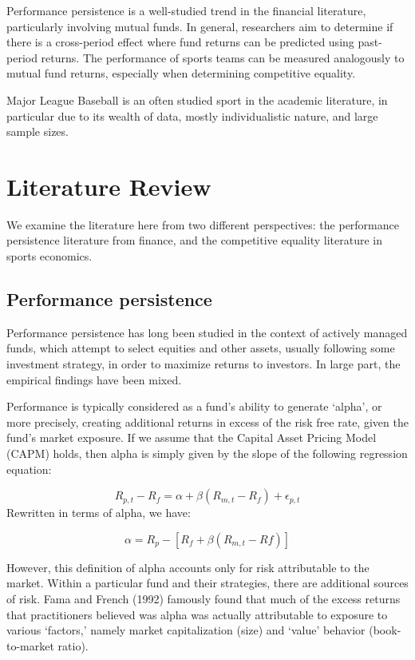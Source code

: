 \documentclass[11pt,]{article}
\begin{document}
Performance persistence is a well-studied trend in the financial
literature, particularly involving mutual funds. In general, researchers
aim to determine if there is a cross-period effect where fund returns
can be predicted using past-period returns. The performance of sports
teams can be measured analogously to mutual fund returns, especially
when determining competitive equality.

Major League Baseball is an often studied sport in the academic
literature, in particular due to its wealth of data, mostly
individualistic nature, and large sample sizes.

\section{Literature Review}\label{literature-review}

We examine the literature here from two different perspectives: the
performance persistence literature from finance, and the competitive
equality literature in sports economics.

\subsection{Performance persistence}\label{performance-persistence}

Performance persistence has long been studied in the context of actively
managed funds, which attempt to select equities and other assets,
usually following some investment strategy, in order to maximize returns
to investors. In large part, the empirical findings have been mixed.

Performance is typically considered as a fund's ability to generate
`alpha', or more precisely, creating additional returns in excess of the
risk free rate, given the fund's market exposure. If we assume that the
Capital Asset Pricing Model (CAPM) holds, then alpha is simply given by
the slope of the following regression equation:

\[R_{p, t} - R_{f} = \alpha + \beta(R_{m,t} - R_f) + \epsilon_{p,t}\]
Rewritten in terms of alpha, we have:

\[\alpha = R_p - [R_f + \beta(R_{m,t} - Rf)]\]

However, this definition of alpha accounts only for risk attributable to
the market. Within a particular fund and their strategies, there are
additional sources of risk. Fama and French (1992) famously found that
much of the excess returns that practitioners believed was alpha was
actually attributable to exposure to various `factors,' namely market
capitalization (size) and `value' behavior (book-to-market ratio).
\end{document}
